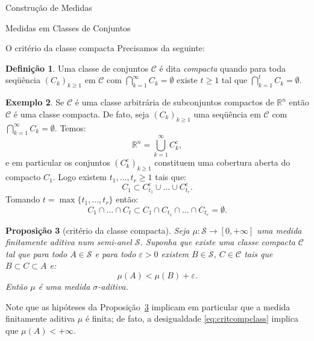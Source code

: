 \documentclass[oneside,final,11pt]{amsbook}
\newcommand{\R}{\mathds R}
\newcommand{\compl}{\mathrm c}
\theoremstyle{remark}\newtheorem{exercise}{Exercício}[chapter]
\theoremstyle{remark}\newtheorem{*exercise}[exercise]{\hbox to 0pt{\hskip 0pt minus 1fil*}Exercício}
\theoremstyle{definition}\newtheorem{exdefin}{Definição}[chapter]
\theoremstyle{plain}\newtheorem{teo}{Teorema}[section]
\theoremstyle{plain}\newtheorem{lem}[teo]{Lema}
\theoremstyle{plain}\newtheorem{prop}[teo]{Proposição}
\theoremstyle{plain}\newtheorem{cor}[teo]{Corolário}
\theoremstyle{definition}\newtheorem{defin}[teo]{Definição}
\theoremstyle{remark}\newtheorem{rem}[teo]{Observação}
\theoremstyle{definition}\newtheorem{notation}[teo]{Notação}
\theoremstyle{definition}\newtheorem{convention}[teo]{Convenção}
\theoremstyle{definition}\newtheorem{example}[teo]{Exemplo}
\numberwithin{section}{chapter}
\numberwithin{equation}{section}
\begin{document}
\begin{chapter}{Construção de Medidas}
\begin{section}{Medidas em Classes de Conjuntos}
\begin{subsection}{O critério da classe compacta}
Precisamos da seguinte:
\begin{defin}
Uma classe de conjuntos $\mathcal C$ é dita
{\em compacta\/} quando para toda seqüência
$(C_k)_{k\ge1}$ em $\mathcal C$ com $\bigcap_{k=1}^\infty C_k=\emptyset$ existe $t\ge1$
tal que $\bigcap_{k=1}^tC_k=\emptyset$.
\end{defin}

\begin{example}\label{exa:classedecompactos}
Se $\mathcal C$ é uma classe arbitrária de subconjuntos compactos de $\R^n$ então $\mathcal C$ é uma
classe compacta. De fato, seja $(C_k)_{k\ge1}$ uma seqüência em $\mathcal C$ com
$\bigcap_{k=1}^\infty C_k=\emptyset$. Temos:
\[\R^n=\bigcup_{k=1}^\infty C_k^\compl,\]
e em particular os conjuntos $(C_k^\compl)_{k\ge1}$ constituem uma cobertura aberta
do compacto $C_1$. Logo existem $t_1,\ldots,t_r\ge1$ tais que:
\[C_1\subset C_{t_1}^\compl\cup\ldots\cup C_{t_r}^\compl.\]
Tomando $t=\max\{t_1,\ldots,t_r\}$ então:
\[C_1\cap\ldots\cap C_t\subset C_1\cap C_{t_1}\cap\ldots\cap C_{t_r}=\emptyset.\]
\end{example}

\begin{prop}[critério da classe compacta]%
%
\label{thm:critcompclass}
Seja $\mu:\mathcal S\to[0,+\infty]$ uma medida finitamente aditiva num semi-anel $\mathcal S$.
Suponha que existe uma classe compacta $\mathcal C$ tal que para todo $A\in\mathcal S$
e para todo $\varepsilon>0$ existem $B\in\mathcal S$, $C\in\mathcal C$ tais que
$B\subset C\subset A$ e:
\begin{equation}\label{eq:critcompclass}
\mu(A)<\mu(B)+\varepsilon.
\end{equation}
Então $\mu$ é uma medida $\sigma$-aditiva.
\end{prop}
Note que as hipóteses da Proposição~\ref{thm:critcompclass} implicam em particular
que a medida finitamente aditiva $\mu$ é finita; de fato, a desigualdade \eqref{eq:critcompclass}
implica que $\mu(A)<+\infty$.


\end{subsection}
\end{section}
\end{chapter}
\end{document}
